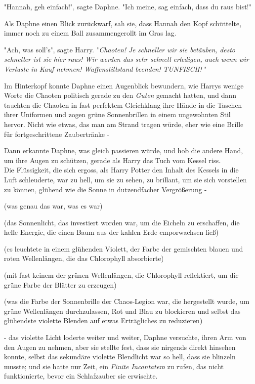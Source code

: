 {"Hannah, geh einfach!", sagte Daphne. "Ich meine, sag einfach, dass du raus bist!"

Als Daphne einen Blick zurückwarf, sah sie, dass Hannah den Kopf schüttelte, immer noch zu einem Ball zusammengerollt im Gras lag.

"Ach, was soll's", sagte Harry. "\emph{Chaoten! Je schneller wir sie betäuben, desto schneller ist sie hier raus! Wir werden das sehr schnell erledigen, auch wenn wir Verluste in Kauf nehmen! Waffenstillstand beenden! TUNFISCH!} "

Im Hinterkopf konnte Daphne einen Augenblick bewundern, wie Harrys wenige Worte die Chaoten politisch gerade zu den \emph{Guten} gemacht hatten, und dann tauchten die Chaoten in fast perfektem Gleichklang ihre Hände in die Taschen ihrer Uniformen und zogen grüne Sonnenbrillen in einem ungewohnten Stil hervor. Nicht wie etwas, das man am Strand tragen würde, eher wie eine Brille für fortgeschrittene Zaubertränke -

Dann erkannte Daphne, was gleich passieren würde, und hob die andere Hand, um ihre Augen zu schützen, gerade als Harry das Tuch vom Kessel riss.\\ Die Flüssigkeit, die sich ergoss, als Harry Potter den Inhalt des Kessels in die Luft schleuderte, war zu hell, um sie zu sehen, zu brillant, um sie sich vorstellen zu können, glühend wie die Sonne in dutzendfacher Vergrößerung -

(was genau das war, was es war)

(das Sonnenlicht, das investiert worden war, um die Eicheln zu erschaffen, die helle Energie, die einen Baum aus der kahlen Erde emporwachsen ließ)

(es leuchtete in einem glühenden Violett, der Farbe der gemischten blauen und roten Wellenlängen, die das Chlorophyll absorbierte)

(mit fast keinem der grünen Wellenlängen, die Chlorophyll reflektiert, um die grüne Farbe der Blätter zu erzeugen)

(was die Farbe der Sonnenbrille der Chaos-Legion war, die hergestellt wurde, um grüne Wellenlängen durchzulassen, Rot und Blau zu blockieren und selbst das glühendste violette Blenden auf etwas Erträgliches zu reduzieren)

- das violette Licht loderte weiter und weiter, Daphne versuchte, ihren Arm von den Augen zu nehmen, aber sie stellte fest, dass sie nirgends direkt hinsehen konnte, selbst das sekundäre violette Blendlicht war so hell, dass sie blinzeln musste; und sie hatte nur Zeit, ein \emph{Finite Incantatem} zu rufen, das nicht funktionierte, bevor ein Schlafzauber sie erwischte.

}
